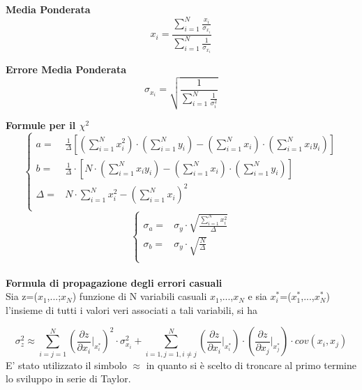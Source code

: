 \documentclass[a4paper,11pt,oneside]{article}
\begin{document}
\textbf{Media Ponderata}
\begin{equation*}
\label{eq:media_pond}
    x_i=\frac{\sum_{i=1}^{N}\frac{x_i}{\sigma_{x_i}}}{\sum_{i=1}^{N}\frac{1}{\sigma_{x_i}}}
\end{equation*}

\textbf{Errore Media Ponderata}
\begin{equation*}
\label{eq:errore_media_pond}
     \sigma_{x_i}=\sqrt{\frac{1}{\sum_{i=1}^{N}\frac{1}{\sigma_{i}^{2}}}}
\end{equation*}

\textbf{Formule per il ${\chi}^2$}
\begin{equation*}
        \begin{cases}
    a=&\frac{1}{\Delta}[(\sum\limits_{i=1}^{N}{x_{i}^{2}})\cdot(\sum\limits_{i=1}^{N}{y_{i}})-(\sum\limits_{i=1}^{N}{x_{i}})\cdot(\sum\limits_{i=1}^{N}{x_{i}y_{i}})] \\ 
    b=&\frac{1}{\Delta }\cdot \left [N\cdot \left ( \sum\limits_{i=1}^{N}x_i y_i \right )-\left ( \sum\limits_{i=1}^{N}x_i \right )\cdot \left ( \sum\limits_{i=1}^{N}y_i \right )  \right ]\\
    \Delta=& N\cdot \sum\limits_{i=1}^{N} x_i^{2} - \left ( \sum\limits_{i=1}^{N}x_i \right )^{2}\\
    \end{cases}
\end{equation*}
\begin{equation*}
    \begin{cases}
    \sigma_{a}=&\sigma_{y}\cdot\sqrt{\frac{\sum_{i=1}^{N}{x_{i}^{2}}}{\Delta}} \\
    \sigma_{b}=&\sigma_y\cdot \sqrt{\frac{N}{\Delta }}\\
    \end{cases}
    \label{equation:err_chi_quadro}
\end{equation*}
\\
\textbf{Formula di propagazione degli errori casuali}\\

Sia z=($x_1$,...;$x_N$) funzione di N variabili casuali $x_1$,...,$x_N$ e sia ${x_i^\ast}$=($x_1^\ast$,...,$x_N^{\ast}$) l'insieme di tutti i valori veri associati a tali variabili, si ha 

\begin{equation*}
    \sigma_z^{2}\approx  \sum_{i=j=1}^{N}\left ( \frac{\partial z}{\partial x_i}\Big|_{x_i^{\ast}} \right )^{2}\cdot\sigma_{x_i}^{2} +\sum_{i=1,j=1,i\neq j}^{N}\left (\frac{\partial z }{\partial x_i}\Big|_{x_i^{\ast}} \right ) \cdot \left ( \frac{\partial z}{\partial x_j} \Big|_{x_j^{\ast}} \right )\cdot cov(x_i,x_j)\label{eq:prop_errori}
\end{equation*}
E' stato utilizzato il simbolo $\approx$ in quanto si è scelto di troncare al primo termine lo sviluppo in serie di Taylor.\\
\end{document}
